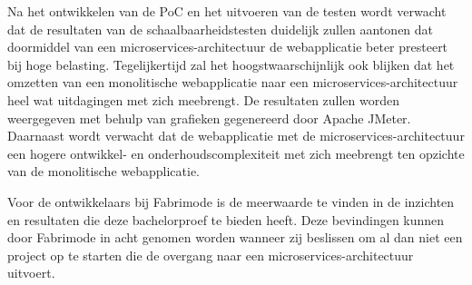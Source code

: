 Na het ontwikkelen van de PoC en het uitvoeren van de testen wordt verwacht dat de resultaten van de schaalbaarheidstesten duidelijk zullen aantonen dat doormiddel van een microservices-architectuur de webapplicatie beter presteert bij hoge belasting. Tegelijkertijd zal het hoogstwaarschijnlijk ook blijken dat het omzetten van een monolitische webapplicatie naar een microservices-architectuur heel wat uitdagingen met zich meebrengt. De resultaten zullen worden weergegeven met behulp van grafieken gegenereerd door Apache JMeter. Daarnaast wordt verwacht dat de webapplicatie met de microservices-architectuur een hogere ontwikkel- en onderhoudscomplexiteit met zich meebrengt ten opzichte van de monolitische webapplicatie.

Voor de ontwikkelaars bij Fabrimode is de meerwaarde te vinden in de inzichten en resultaten die deze bachelorproef te bieden heeft. Deze bevindingen kunnen door Fabrimode in acht genomen worden wanneer zij beslissen om al dan niet een project op te starten die de overgang naar een microservices-architectuur uitvoert.


